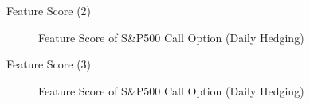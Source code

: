 \documentclass[10pt,table,mathserif]{beamer}
\begin{document}
\begin{frame}[fragile]{Feature Score (2)}
\begin{figure}[htp]
  \centering
  \caption{Feature Score of S\&P500 Call Option (Daily Hedging)} \label{fig:call1}
\end{figure}
\end{frame}

\begin{frame}[fragile]{Feature Score (3)}
\begin{figure}[htp]
  \centering
  \caption{Feature Score of S\&P500 Call Option (Daily Hedging)} \label{fig:call1}
\end{figure}
\end{frame}
\end{document}
